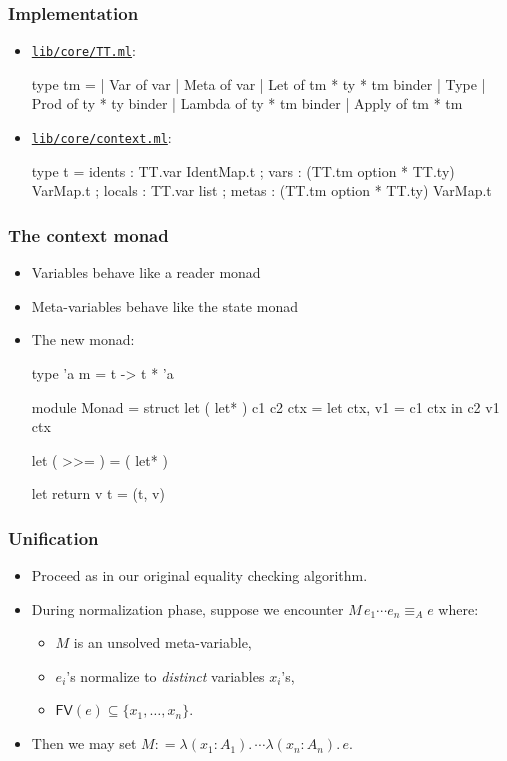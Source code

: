 \documentclass[handout,10pt,aspectratio=169]{beamer}
\newcommand{\lam}[1]{\lambda (#1).\,}
\newcommand{\codeRef}[1]{\href{https://github.com/andrejbauer/faux-type-theory/blob/main/holey-fauxtt/#1}{\texttt{#1}}}
\begin{document}
\begin{frame}[fragile]
  \frametitle{Implementation}

  \begin{itemize}
  \item \codeRef{lib/core/TT.ml}:
\begin{fauxttlisting}
type tm =
  | Var of var
  | Meta of var
  | Let of tm * ty * tm binder
  | Type
  | Prod of ty * ty binder
  | Lambda of ty * tm binder
  | Apply of tm * tm
\end{fauxttlisting}
\item \codeRef{lib/core/context.ml}:
\begin{fauxttlisting}
type t =
  { idents : TT.var IdentMap.t
  ; vars : (TT.tm option * TT.ty) VarMap.t
  ; locals : TT.var list
  ; metas : (TT.tm option * TT.ty) VarMap.t
  }
\end{fauxttlisting}
  \end{itemize}
\end{frame}

\begin{frame}[fragile]
  \frametitle{The context monad}

  \begin{itemize}
  \item Variables behave like a reader monad
  \item Meta-variables behave like the state monad
  \item \pause
    The new monad:
\begin{fauxttlisting}
type 'a m = t -> t * 'a

module Monad =
struct
  let ( let* ) c1 c2 ctx =
    let ctx, v1 = c1 ctx in
    c2 v1 ctx

  let ( >>= ) = ( let* )

  let return v t = (t, v)
\end{fauxttlisting}
\end{itemize}
\end{frame}

\begin{frame}
  \frametitle{Unification}

  \begin{itemize}
  \item Proceed as in our original equality checking algorithm.
  \item \pause During normalization phase, suppose we encounter
    $
      M \, e_1 \cdots e_n \equiv_A e
    $
    where:
    \begin{itemize}
    \item $M$ is an unsolved meta-variable,
    \item $e_i$'s normalize to \emph{distinct} variables $x_i$'s,
    \item $\mathsf{FV}(e) \subseteq \{x_1, \ldots, x_n\}$.
    \end{itemize}
  \item \pause Then we may set $M \mathrel{{:}{=}} \lam{x_1 : A_1} \cdots \lam{x_n : A_n} e$.
  \end{itemize}

\end{frame}
\end{document}
